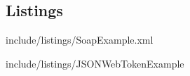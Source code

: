 \subsection{Listings}\label{subsec:listings}

	
	{include/listings/SoapExample.xml}

	
	{include/listings/JSONWebTokenExample}
